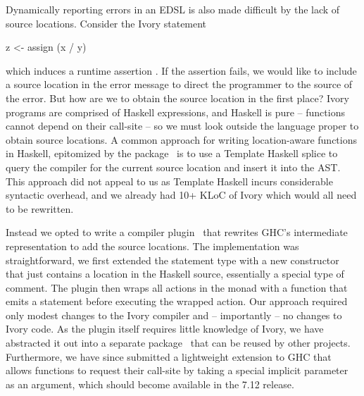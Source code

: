 Dynamically reporting errors in an EDSL is also made difficult by the lack of
source locations. Consider the Ivory statement
\begin{code}
z <- assign (x / y)
\end{code}
which induces a runtime assertion . If the assertion fails, we would
like to include a source location in the error message to direct the programmer
to the source of the error. But how are we to obtain the source location in the
first place? Ivory programs are comprised of Haskell expressions, and Haskell is
pure -- functions cannot depend on their call-site -- so we must look outside
the language proper to obtain source locations. A common approach for writing
location-aware functions in Haskell, epitomized by the 
package~\cite{} is to use a Template Haskell splice to query the compiler for
the current source location and insert it into the AST. This approach did not
appeal to us as Template Haskell incurs considerable syntactic overhead, and we
already had 10+ KLoC of Ivory which would all need to be rewritten.

Instead we opted to write a compiler plugin~\cite{} that rewrites GHC's
intermediate representation to add the source locations. The implementation was
straightforward, we first extended the  statement type with a new
 constructor that just contains a location in the Haskell source,
essentially a special type of comment. The plugin then wraps all actions in the
 monad with a  function that emits a 
statement before executing the wrapped action. Our approach required only modest
changes to the Ivory compiler and -- importantly -- no changes to Ivory code. As
the plugin itself requires little knowledge of Ivory, we have abstracted it out
into a separate package~\cite{} that can be reused by other projects.
Furthermore, we have since submitted a lightweight extension to GHC that allows
functions to request their call-site by taking a special implicit
parameter~\cite{} as an argument, which should become available in the 7.12
release.


